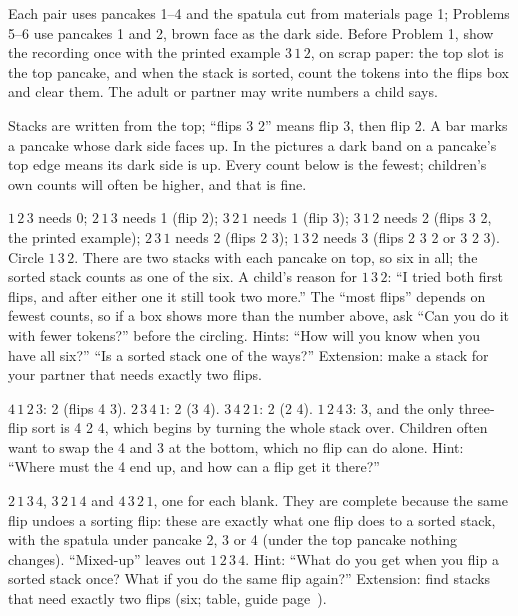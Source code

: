 \newpage
{}
Each pair uses pancakes 1--4 and the spatula cut from materials page 1; Problems 5--6 use pancakes 1 and 2, brown face as the dark side. Before Problem 1, show the recording once with the printed example $3\,1\,2$, on scrap paper: the top slot is the top pancake, and when the stack is sorted, count the tokens into the flips box and clear them. The adult or partner may write numbers a child says.

Stacks are written from the top; ``flips 3 2'' means flip 3, then flip 2. A bar marks a pancake whose dark side faces up. In the pictures a dark band on a pancake's top edge means its dark side is up. Every count below is the fewest; children's own counts will often be higher, and that is fine.

$1\,2\,3$ needs 0; $2\,1\,3$ needs 1 (flip 2); $3\,2\,1$ needs 1 (flip 3); $3\,1\,2$ needs 2 (flips 3 2, the printed example); $2\,3\,1$ needs 2 (flips 2 3); $1\,3\,2$ needs 3 (flips 2 3 2 or 3 2 3). Circle $1\,3\,2$. There are two stacks with each pancake on top, so six in all; the sorted stack counts as one of the six. A child's reason for $1\,3\,2$: ``I tried both first flips, and after either one it still took two more.'' The ``most flips'' depends on fewest counts, so if a box shows more than the number above, ask ``Can you do it with fewer tokens?'' before the circling. Hints: ``How will you know when you have all six?'' ``Is a sorted stack one of the ways?'' Extension: make a stack for your partner that needs exactly two flips.

$4\,1\,2\,3$: 2 (flips 4 3). $2\,3\,4\,1$: 2 (3 4). $3\,4\,2\,1$: 2 (2 4). $1\,2\,4\,3$: 3, and the only three-flip sort is 4 2 4, which begins by turning the whole stack over. Children often want to swap the 4 and 3 at the bottom, which no flip can do alone. Hint: ``Where must the 4 end up, and how can a flip get it there?''

$2\,1\,3\,4$, $3\,2\,1\,4$ and $4\,3\,2\,1$, one for each blank. They are complete because the same flip undoes a sorting flip: these are exactly what one flip does to a sorted stack, with the spatula under pancake 2, 3 or 4 (under the top pancake nothing changes). ``Mixed-up'' leaves out $1\,2\,3\,4$. Hint: ``What do you get when you flip a sorted stack once? What if you do the same flip again?'' Extension: find stacks that need exactly two flips (six; table, guide page~\pageref{tab:four}).

